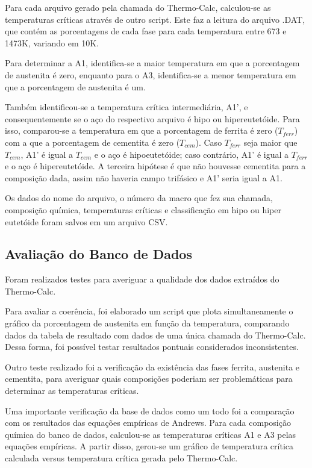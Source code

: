 \documentclass[brazil,tf,epusp]{usp}  %
\begin{document}
Para cada arquivo gerado pela chamada do Thermo-Calc\textregistered{}, calculou-se as temperaturas críticas através de outro script. Este faz a leitura do arquivo .DAT, que contém as porcentagens de cada fase para cada temperatura entre 673 e 1473K, variando em 10K.

Para determinar a A1, identifica-se a maior temperatura em que a porcentagem de austenita é zero, enquanto para o A3, identifica-se a menor temperatura em que a porcentagem de austenita é um.

Também identificou-se a temperatura crítica intermediária, A1', e consequentemente se o aço do respectivo arquivo é hipo ou hipereutetóide. Para isso, comparou-se a temperatura em que a porcentagem de ferrita é zero ($T_{ferr}$) com a que a porcentagem de cementita é zero ($T_{cem}$). Caso $T_{ferr}$ seja maior que $T_{cem}$, A1' é igual a $T_{cem}$ e o aço é hipoeutetóide; caso contrário, A1' é igual a $T_{ferr}$ e o aço é hipereutetóide. A terceira hipótese é que não houvesse cementita para a composição dada, assim não haveria campo trifásico e A1' seria igual a A1.

Os dados do nome do arquivo, o número da macro que fez sua chamada, composição química, temperaturas críticas e classificação em hipo ou hiper eutetóide foram salvos em um arquivo CSV.

\subsection{Avaliação do Banco de Dados}

Foram realizados testes para averiguar a qualidade dos dados extraídos do Thermo-Calc\textregistered{}.

Para avaliar a coerência, foi elaborado um script que plota simultaneamente o gráfico da porcentagem de austenita em função da temperatura, comparando dados da tabela de resultado com dados de uma única chamada do Thermo-Calc\textregistered{}. Dessa forma, foi possível testar resultados pontuais considerados inconsistentes.

Outro teste realizado foi a verificação da existência das fases ferrita, austenita e cementita, para averiguar quais composições poderiam ser problemáticas para determinar as temperaturas críticas.

Uma importante verificação da base de dados como um todo foi a comparação com os resultados das equações empíricas de Andrews. Para cada composição química do banco de dados, calculou-se as temperaturas críticas A1 e A3 pelas equações empíricas. A partir disso, gerou-se um gráfico de temperatura crítica calculada versus temperatura crítica gerada pelo Thermo-Calc\textregistered{}.
\end{document}
